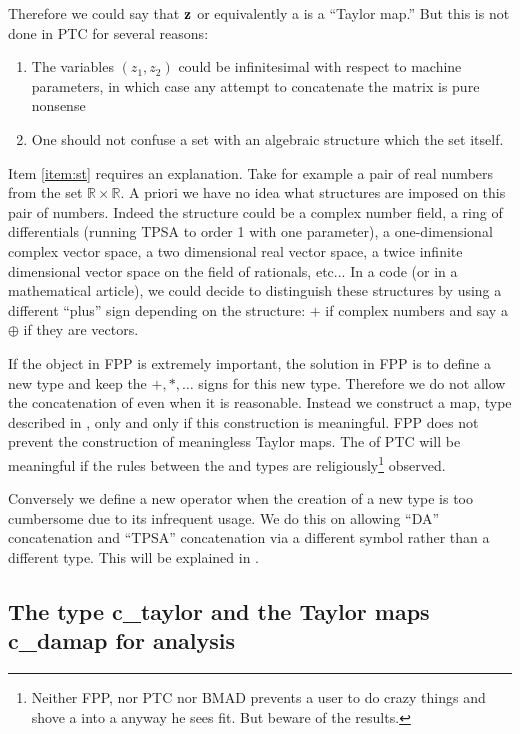 \documentclass[english,12pt,article]{article} %
\begin{document}
{Therefore we could say that ${\bf z}$ or equivalently a   is a ``Taylor map.''  But this is not done in PTC for several reasons:

\begin{enumerate}
\item The variables  $(z_1,z_2)$ could  be  infinitesimal with respect to machine parameters, in which case any attempt to concatenate the matrix is pure nonsense 
\item\label{item:st}  One should not confuse a set with an algebraic structure which  the  set itself.
\end{enumerate}

Item \ref{item:st} requires an explanation. Take for example  a pair of real numbers from the set  $\mathbb{R} \times \mathbb{R}$.  A priori we have no idea what structures are imposed on this pair of numbers. Indeed the structure could be    a complex number field, a ring of differentials (running TPSA to order 1 with one parameter),  a one-dimensional complex vector space, a two dimensional real vector space, a twice infinite dimensional  vector space on the field of rationals, etc... In a code (or in a mathematical article), we could decide to  distinguish these structures by using a different ``plus'' sign depending on the structure: $+$ if complex numbers and say a $\oplus$ if they are vectors. 

If the object in FPP is extremely important, the solution in FPP is to define  a new type and  keep the $+,*,\ldots $ signs for this new type.  Therefore we do not allow the concatenation of  even when it is reasonable. Instead we construct a map, type  described in , only and only if this construction is meaningful.  FPP does not prevent the construction of meaningless Taylor maps. The   of PTC will be meaningful if the rules between the  and   types are religiously\footnote{Neither FPP, nor PTC nor  BMAD prevents  a user to do crazy things and shove a   into a   anyway he sees fit. But beware of the results.}  observed.  

Conversely we define a new operator when the creation of a new type is too cumbersome due to its infrequent usage. We do this on  allowing ``DA'' concatenation and ``TPSA'' concatenation via a different symbol rather than a different type. This will  be explained in .


\subsection{The type c_taylor and the Taylor maps c_damap for analysis}\label{sec:raymap}
 
}
\end{document}
